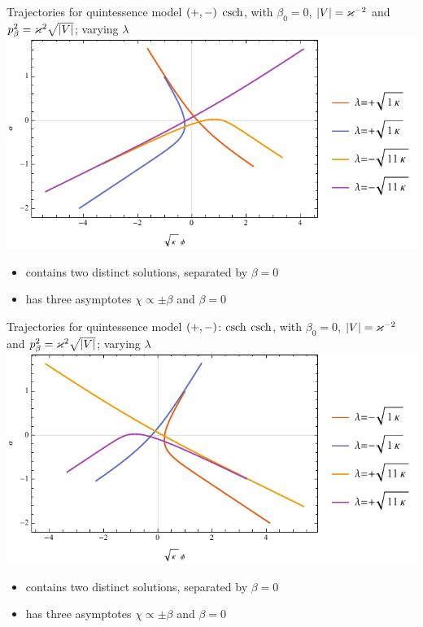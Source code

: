 \documentclass[9pt]{beamer}
\begin{document}
\begin{frame}%
{Trajectories for quintessence model ${\left(+,-\right)}$}%
{$\operatorname{csch}$, with $\beta_0 = 0$, ${\left|V\right|} = \varkappa^{-2}$ and
$p_\beta^2 = \varkappa^2\sqrt{{\left|V\right|}}$; varying $\lambda$}
\includegraphics[width=\textwidth]{../plots.nb/csch_lamb_l.pdf}
\begin{itemize}
	\item contains two distinct solutions, separated by $\beta = 0$
	\item has three asymptotes $\chi \propto \pm \beta$ and $\beta = 0$
\end{itemize}
\end{frame}

\begin{frame}%
{Trajectories for quintessence model ${\left(+,-\right)}$: $\operatorname{csch}$}%
{$\operatorname{csch}$, with $\beta_0 = 0$, ${\left|V\right|} = \varkappa^{-2}$ and
$p_\beta^2 = \varkappa^2\sqrt{{\left|V\right|}}$; varying $\lambda$}
\includegraphics[width=\textwidth]{../plots.nb/csch_lamb_r.pdf}
\begin{itemize}
	\item contains two distinct solutions, separated by $\beta = 0$
	\item has three asymptotes $\chi \propto \pm \beta$ and $\beta = 0$
\end{itemize}
\end{frame}
\end{document}
